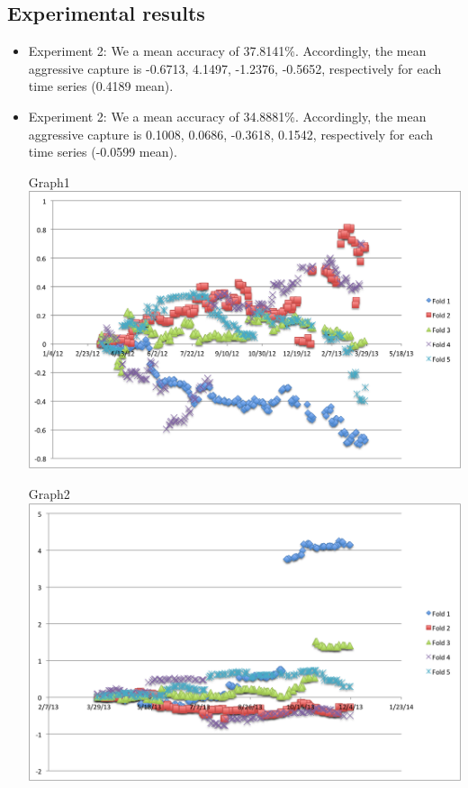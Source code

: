 \documentclass[11pt,letterpaper]{article}
\newcommand{\blue}[1]{\textcolor{RoyalBlue}{#1}}
\newcommand{\instructions}[1]{\blue{\textit{#1}}}
\begin{document}
\subsection{Experimental results}
\label{sec:experimental-results}
\begin{itemize}
\item Experiment 2: We a mean accuracy of
  37.8141\%. Accordingly, the mean aggressive capture is -0.6713, 4.1497,
  -1.2376, -0.5652, respectively for each time series (0.4189 mean).
\item Experiment 2: We a mean accuracy of
  34.8881\%. Accordingly, the mean aggressive capture is 0.1008, 0.0686,
  -0.3618, 0.1542, respectively for each time series (-0.0599 mean).
  
  Graph1 \\
  
\includegraphics[width=14cm]{images/unweighted-exp-0.png}

  Graph2 \\
  
\includegraphics[width=14cm]{images/unweighted-exp-1.png}


\end{itemize}
\end{document}
